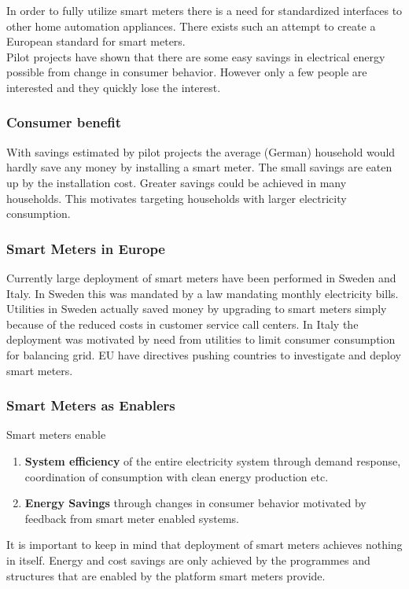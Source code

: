 In order to fully utilize smart meters there is a need for standardized interfaces to other home automation appliances.
There exists such an attempt to create a European standard for smart meters.\\

Pilot projects have shown that there are some easy savings in electrical energy possible from change in consumer behavior.
However only a few people are interested and they quickly lose the interest.

\subsubsection{Consumer benefit}
With savings estimated by pilot projects the average (German) household would hardly save any money by installing a smart meter. The small savings are eaten up by the installation cost.
Greater savings could be achieved in many households.
This motivates targeting households with larger electricity consumption.

\subsubsection{Smart Meters in Europe}
Currently large deployment of smart meters have been performed in Sweden and Italy.
In Sweden this was mandated by a law mandating monthly electricity bills.
Utilities in Sweden actually saved money by upgrading to smart meters simply because of the reduced costs in customer service call centers.
In Italy the deployment was motivated by need from utilities to limit consumer consumption for balancing grid.
EU have directives pushing countries to investigate and deploy smart meters.

\subsubsection{Smart Meters as Enablers}
Smart meters enable
\begin{enumerate}
    \item \textbf{System efficiency} of the entire electricity system through demand response, coordination of consumption with clean energy production etc.
    \item \textbf{Energy Savings} through changes in consumer behavior motivated by feedback from smart meter enabled systems.
\end{enumerate}

It is important to keep in mind that deployment of smart meters achieves nothing in itself.
Energy and cost savings are only achieved by the programmes and structures that are enabled by the platform smart meters provide.

